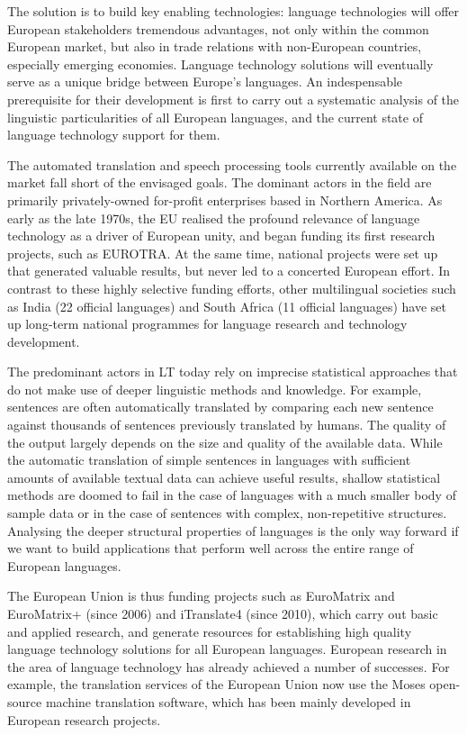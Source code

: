 \begin{multicols}{2}
  The solution is to build key enabling technologies: language technologies will offer European stakeholders tremendous advantages, not only within the common European market, but also in trade relations with non-European countries, especially emerging economies. Language technology solutions will eventually serve as a unique bridge between Europe's languages. An indespensable prerequisite for their development is first to carry out a systematic analysis of the linguistic particularities of all European languages, and the current state of language technology support for them.  

  The automated translation and speech processing tools currently available on the market fall short of the envisaged goals. The dominant actors in the field are primarily privately-owned for-profit enterprises based in Northern America. As early as the late 1970s, the EU realised the profound relevance of language technology as a driver of European unity, and began funding its first research projects, such as EUROTRA. At the same time, national projects were set up that generated valuable results, but never led to a concerted European effort. In contrast to these highly selective funding efforts, other multilingual societies such as India (22 official languages) and South Africa (11 official languages) have set up long-term national programmes for language research and technology development. 

  The predominant actors in LT today rely on imprecise statistical approaches that do not make use of deeper linguistic methods and knowledge. For example, sentences are often automatically translated by comparing each new sentence against thousands of sentences previously translated by humans. The quality of the output largely depends on the size and quality of the available  data. While the automatic translation of simple sentences in languages with sufficient amounts of available textual data can achieve useful results, shallow statistical methods are doomed to fail in the case of languages with a much smaller body of sample data or in the case of sentences with complex, non-repetitive structures. Analysing the deeper structural properties of languages is the only way forward if we want to build applications that perform well across the entire range of European languages.


  The European Union is thus funding projects such as EuroMatrix and EuroMatrix+ (since 2006) and iTranslate4 (since 2010), which carry out basic and applied research, and generate resources for establishing high quality language technology solutions for all European languages. 
  European research in the area of language technology has already achieved a number of successes. For example, the translation services of the European Union now use the Moses open-source machine translation software, which has been mainly developed in European research projects. 


\end{multicols}
